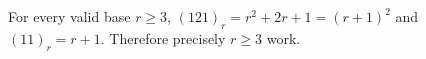 For every valid base $ r\ge3 $, $(121)_r=r^2+2r+1=(r+1)^2 $ and $(11)_r=r+1 $. Therefore precisely $\boxed{r\ge3}$ work.
